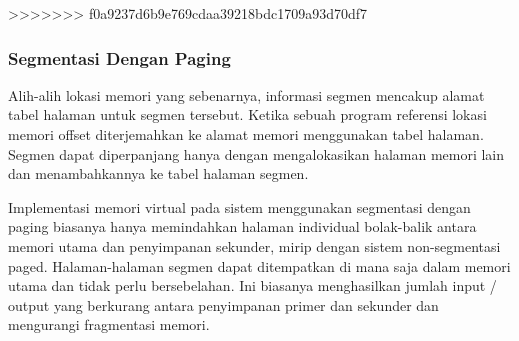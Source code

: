 >>>>>>> f0a9237d6b9e769cdaa39218bdc1709a93d70df7

\subsubsection {Segmentasi Dengan Paging}
Alih-alih lokasi memori yang sebenarnya, informasi segmen mencakup alamat tabel halaman untuk segmen tersebut. Ketika sebuah program referensi lokasi memori offset diterjemahkan ke alamat memori menggunakan tabel halaman. Segmen dapat diperpanjang hanya dengan mengalokasikan halaman memori lain dan menambahkannya ke tabel halaman segmen.

Implementasi memori virtual pada sistem menggunakan segmentasi dengan paging biasanya hanya memindahkan halaman individual bolak-balik antara memori utama dan penyimpanan sekunder, mirip dengan sistem non-segmentasi paged. Halaman-halaman segmen dapat ditempatkan di mana saja dalam memori utama dan tidak perlu bersebelahan. Ini biasanya menghasilkan jumlah input / output yang berkurang antara penyimpanan primer dan sekunder dan mengurangi fragmentasi memori.